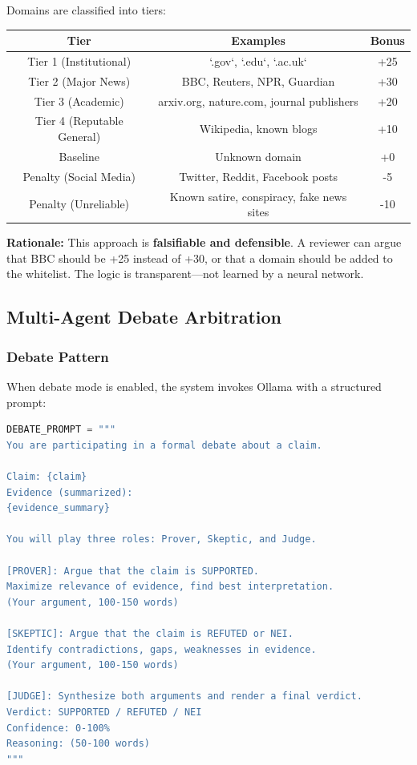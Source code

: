 \documentclass[12pt,a4paper,twoside]{article}
\begin{document}
Domains are classified into tiers:

\begin{table}[H]
    \centering
    \begin{tabular}{|c|c|c|}
        \hline
        \textbf{Tier} & \textbf{Examples} & \textbf{Bonus} \\
        \hline
        Tier 1 (Institutional) & `.gov`, `.edu`, `.ac.uk` & +25 \\
        Tier 2 (Major News) & BBC, Reuters, NPR, Guardian & +30 \\
        Tier 3 (Academic) & arxiv.org, nature.com, journal publishers & +20 \\
        Tier 4 (Reputable General) & Wikipedia, known blogs & +10 \\
        Baseline & Unknown domain & +0 \\
        Penalty (Social Media) & Twitter, Reddit, Facebook posts & -5 \\
        Penalty (Unreliable) & Known satire, conspiracy, fake news sites & -10 \\
        \hline
    \end{tabular}
\end{table}

\textbf{Rationale:} This approach is \textbf{falsifiable and defensible}. A reviewer can argue that BBC should be +25 instead of +30, or that a domain should be added to the whitelist. The logic is transparent—not learned by a neural network.

\subsection{Multi-Agent Debate Arbitration}

\subsubsection{Debate Pattern}

When debate mode is enabled, the system invokes Ollama with a structured prompt:

\begin{lstlisting}[language=python]
DEBATE_PROMPT = """
You are participating in a formal debate about a claim.

Claim: {claim}
Evidence (summarized):
{evidence_summary}

You will play three roles: Prover, Skeptic, and Judge.

[PROVER]: Argue that the claim is SUPPORTED. 
Maximize relevance of evidence, find best interpretation.
(Your argument, 100-150 words)

[SKEPTIC]: Argue that the claim is REFUTED or NEI.
Identify contradictions, gaps, weaknesses in evidence.
(Your argument, 100-150 words)

[JUDGE]: Synthesize both arguments and render a final verdict.
Verdict: SUPPORTED / REFUTED / NEI
Confidence: 0-100%
Reasoning: (50-100 words)
"""
\end{lstlisting}
\end{document}
